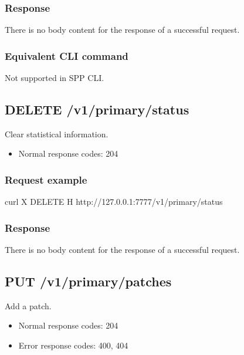 \documentclass[a4paper,11pt,openany,oneside,english]{sphinxmanual}
\begin{document}
\subsubsection{Response}
\label{\detokenize{api_ref/spp_primary:id4}}
There is no body content for the response of a successful  request.


\subsubsection{Equivalent CLI command}
\label{\detokenize{api_ref/spp_primary:id5}}
Not supported in SPP CLI.


\subsection{DELETE /v1/primary/status}
\label{\detokenize{api_ref/spp_primary:delete-v1-primary-status}}
Clear statistical information.
\begin{itemize}
\item {} 
Normal response codes: 204

\end{itemize}


\subsubsection{Request example}
\label{\detokenize{api_ref/spp_primary:id6}}
\begin{sphinxVerbatim}[commandchars=\\\{\},formatcom=\footnotesize]
 curl \PYGZhy{}X DELETE \PYGZhy{}H  
  http://127.0.0.1:7777/v1/primary/status
\end{sphinxVerbatim}


\subsubsection{Response}
\label{\detokenize{api_ref/spp_primary:id7}}
There is no body content for the response of a successful  request.


\subsection{PUT /v1/primary/patches}
\label{\detokenize{api_ref/spp_primary:put-v1-primary-patches}}
Add a patch.
\begin{itemize}
\item {} 
Normal response codes: 204

\item {} 
Error response codes: 400, 404

\end{itemize}
\end{document}
